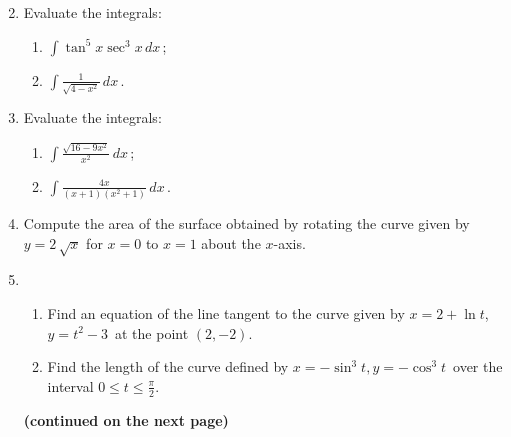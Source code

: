 \documentclass[10pt]{article}
\begin{document}
\begin{enumerate}
\begin{multicols}{2}
\begin{enumerate}
\end{enumerate}
\end{multicols}

\item Evaluate the integrals:

\begin{multicols}{2}
\begin{enumerate}

\item  $\displaystyle\int \tan^5 x \sec^3 x\,dx$\,;

\item  $\displaystyle\int\frac{1}{\sqrt{4-x^2}}\,dx$\,.

\end{enumerate}
\end{multicols}

\item Evaluate the integrals:

\begin{multicols}{2}
\begin{enumerate}

\item $\displaystyle\int\frac{\sqrt{16-9x^2}}{x^2}\,dx$\,;

\item $ \displaystyle\int\frac{4x}{(x+1)(x^2+1)}\,dx$\,.

\end{enumerate}
\end{multicols}

\item Compute the area of the surface obtained by rotating the curve given by $y=2\,\sqrt{x}$ for $x=0$ to $x=1$ about the $x$-axis.

\item
\begin{enumerate}

\item Find an equation of the line tangent to the curve given by $x=2+\ln t$, $y=t^2-3$\ at the point $(2,-2)$.

\item Find the length of the curve defined by $x=-\sin^3 t, y=-\cos^3 t$\ over the interval $0\le t\le \frac{\pi}{2}$.

\end{enumerate}


\begin{center}
\textbf{(continued on the next page)}
\end{center}

\newpage


\end{enumerate}
\end{document}
